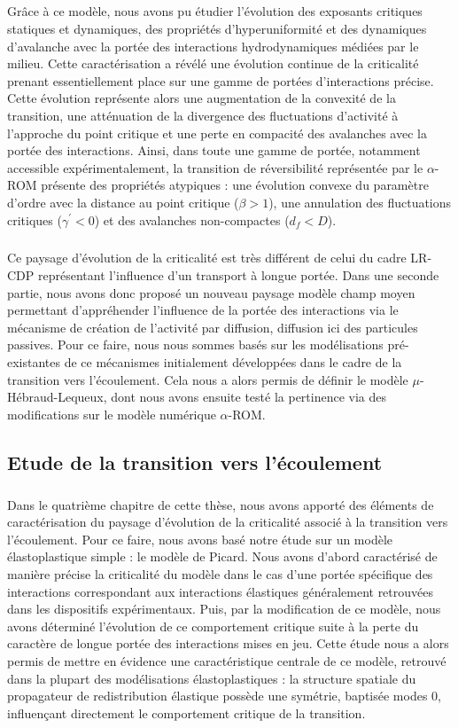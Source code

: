 \subparagraph{}Grâce à ce modèle, nous avons pu étudier l'évolution des exposants critiques statiques et dynamiques, des propriétés d'hyperuniformité et des dynamiques d'avalanche avec la portée des interactions hydrodynamiques médiées par le milieu. Cette caractérisation a révélé une évolution continue de la criticalité prenant essentiellement place sur une gamme de portées d'interactions précise. Cette évolution représente alors une augmentation de la convexité de la transition, une atténuation de la divergence des fluctuations d'activité à l'approche du point critique et une perte en compacité des avalanches avec la portée des interactions. Ainsi, dans toute une gamme de portée, notamment accessible expérimentalement, la transition de réversibilité représentée par le $\alpha$-ROM présente des propriétés atypiques : une évolution convexe du paramètre d'ordre avec la distance au point critique ($\beta > 1$), une annulation des fluctuations critiques ($\gamma^\prime < 0$) et des avalanches non-compactes ($d_f < D$).

\subparagraph{}Ce paysage d'évolution de la criticalité est très différent de celui du cadre LR-CDP représentant l'influence d'un transport à longue portée. Dans une seconde partie, nous avons donc proposé un nouveau paysage modèle champ moyen permettant d'appréhender l'influence de la portée des interactions via le mécanisme de création de l'activité par diffusion, diffusion ici des particules passives. Pour ce faire, nous nous sommes basés sur les modélisations pré-existantes de ce mécanismes initialement développées dans le cadre de la transition vers l'écoulement. Cela nous a alors permis de définir le modèle $\mu$-Hébraud-Lequeux, dont nous avons ensuite testé la pertinence via des modifications sur le modèle numérique $\alpha$-ROM.

\subsection*{Etude de la transition vers l'écoulement}

\subparagraph{}Dans le quatrième chapitre de cette thèse, nous avons apporté des éléments de caractérisation du paysage d'évolution de la criticalité associé à la transition vers l'écoulement. Pour ce faire, nous avons basé notre étude sur un modèle élastoplastique simple : le modèle de Picard. Nous avons d'abord caractérisé de manière précise la criticalité du modèle dans le cas d'une portée spécifique des interactions correspondant aux interactions élastiques généralement retrouvées dans les dispositifs expérimentaux. Puis, par la modification de ce modèle, nous avons déterminé l'évolution de ce comportement critique suite à la perte du caractère de longue portée des interactions mises en jeu. Cette étude nous a alors permis de mettre en évidence une caractéristique centrale de ce modèle, retrouvé dans la plupart des modélisations élastoplastiques : la structure spatiale du propagateur de redistribution élastique possède une symétrie, baptisée modes 0, influençant directement le comportement critique de la transition. 

